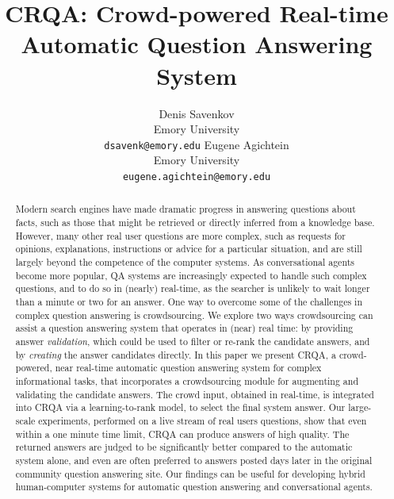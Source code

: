 \documentclass[letterpaper]{article}
\begin{document}
%
\title{CRQA: Crowd-powered Real-time Automatic Question Answering System}
\author{
	Denis Savenkov\\
	Emory University\\
	\texttt{dsavenk@emory.edu}
\And
	Eugene Agichtein\\
	Emory University\\
	\texttt{eugene.agichtein@emory.edu}
}

\maketitle
\begin{abstract}
Modern search engines have made dramatic progress in answering questions about facts, such as those that might be retrieved or directly inferred from a knowledge base.
However, many other real user questions are more complex, such as requests for opinions, explanations, instructions or advice for a particular situation, and are still largely beyond the competence of the computer systems.
As conversational agents become more popular, QA systems are increasingly expected to handle such complex questions, and to do so in (nearly) real-time, as the searcher is unlikely to wait longer than a minute or two for an answer.
One way to overcome some of the challenges in complex question answering is crowdsourcing.
We explore two ways crowdsourcing can assist a question answering system that operates in (near) real time: by providing answer {\em validation}, which could be used to filter or re-rank the candidate answers, and by {\em creating} the answer candidates directly.
In this paper we present CRQA, a crowd-powered, near real-time automatic question answering system for complex informational tasks, that incorporates a crowdsourcing module for augmenting and validating the candidate answers.
The crowd input, obtained in real-time, is integrated into CRQA via a learning-to-rank model, to select the final system answer.
Our large-scale experiments, performed on a live stream of real users questions, show that even within a one minute time limit, CRQA can produce answers of high quality.
The returned answers are judged to be significantly better compared to the automatic system alone, and even are often preferred to answers posted days later in the original community question answering site.
Our findings can be useful for developing hybrid human-computer systems for automatic question answering and conversational agents.
\end{abstract}
\end{document}
